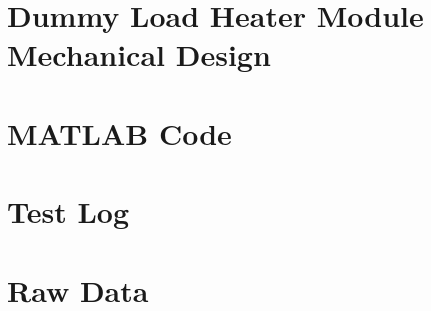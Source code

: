 \documentclass{report}
\begin{document}
\chapter{Dummy Load Heater Module Mechanical Design} \label{app:DummyLoad}



\chapter{MATLAB Code}
\chapter{Test Log}
\chapter{Raw Data}
\end{document}
